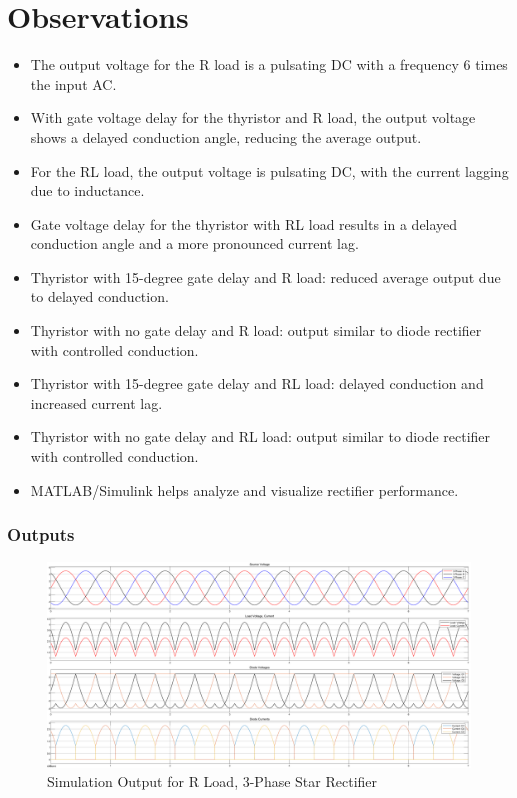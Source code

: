 \documentclass[12pt]{article}
\begin{document}
\section*{Observations}
\begin{itemize}
    \item The output voltage for the R load is a pulsating DC with a frequency 6 times the input AC.
    \item With gate voltage delay for the thyristor and R load, the output voltage shows a delayed conduction angle, reducing the average output.
    \item For the RL load, the output voltage is pulsating DC, with the current lagging due to inductance.
    \item Gate voltage delay for the thyristor with RL load results in a delayed conduction angle and a more pronounced current lag.
    \item Thyristor with 15-degree gate delay and R load: reduced average output due to delayed conduction.
    \item Thyristor with no gate delay and R load: output similar to diode rectifier with controlled conduction.
    \item Thyristor with 15-degree gate delay and RL load: delayed conduction and increased current lag.
    \item Thyristor with no gate delay and RL load: output similar to diode rectifier with controlled conduction.
    \item MATLAB/Simulink helps analyze and visualize rectifier performance.
\end{itemize}


\subsubsection*{Outputs}
\begin{figure}[H]
    \centering
    \includegraphics[width=\textwidth]{r.png}
    \caption{Simulation Output for R Load, 3-Phase Star Rectifier}
    \label{fig:rLoad}
\end{figure}
\end{document}
